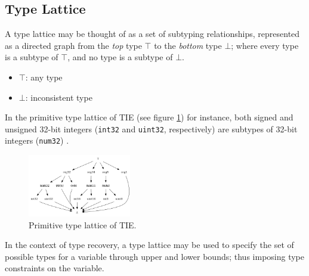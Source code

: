 
\subsection{Type Lattice}

A type lattice may be thought of as a set of subtyping relationships, represented as a directed graph from the \textit{top} type $\top$ to the \textit{bottom} type $\bot$; where every type is a subtype of $\top$, and no type is a subtype of $\bot$.

\begin{itemize}
	\item $\top$: any type
	\item $\bot$: inconsistent type
\end{itemize}

In the primitive type lattice of TIE (see figure \ref{fig:primitive_type_lattice}) for instance, both signed and unsigned 32-bit integers (\texttt{int32} and \texttt{uint32}, respectively) are subtypes of 32-bit integers (\texttt{num32}) \cite{tie_reverse_engineering_of_types}.

\begin{figure}[htbp]
	\centering
	\includegraphics[width=0.40\textwidth]{inc/tie_primitive_type_lattice.png}
	\caption{Primitive type lattice of TIE.}
	\label{fig:primitive_type_lattice}
\end{figure}

In the context of type recovery, a type lattice may be used to specify the set of possible types for a variable through upper and lower bounds; thus imposing type constraints on the variable.
